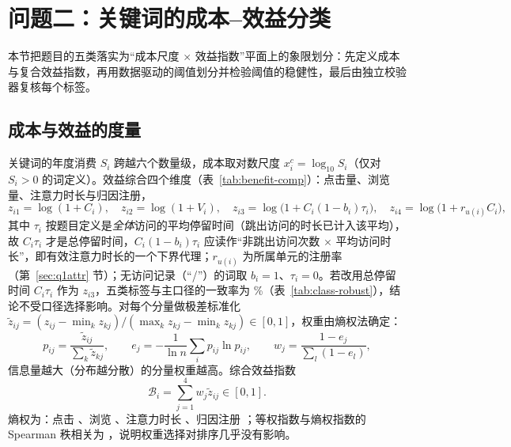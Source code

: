 \section{问题二：关键词的成本--效益分类}
\label{sec:q2}
本节把题目的五类落实为“成本尺度 $\times$ 效益指数”平面上的象限划分：先定义成本与复合效益指数，再用数据驱动的阈值划分并检验阈值的稳健性，最后由独立校验器复核每个标签。

\subsection{成本与效益的度量}
关键词的年度消费 $S_i$ 跨越六个数量级，成本取对数尺度 $x^{c}_i=\log_{10}S_i$（仅对 $S_i>0$ 的词定义）。效益综合四个维度（表~\ref{tab:benefit-comp}）：点击量、浏览量、注意力时长与归因注册，
\begin{equation}\label{eq:benefit-comp}
z_{i1}=\log(1+C_i),\quad z_{i2}=\log(1+V_i),\quad z_{i3}=\log\bigl(1+C_i(1-b_i)\tau_i\bigr),\quad z_{i4}=\log\bigl(1+r_{u(i)}C_i\bigr),
\end{equation}
其中 $\tau_i$ 按题目定义是\emph{全体}访问的平均停留时间（跳出访问的时长已计入该平均），故 $C_i\tau_i$ 才是总停留时间，$C_i(1-b_i)\tau_i$ 应读作“非跳出访问次数 $\times$ 平均访问时长”，即有效注意力时长的一个下界代理；$r_{u(i)}$ 为所属单元的注册率（第~\ref{sec:q1attr} 节）；无访问记录（“/”）的词取 $b_i=1$、$\tau_i=0$。若改用总停留时间 $C_i\tau_i$ 作为 $z_{i3}$，五类标签与主口径的一致率为 \valEngagementVariantAgreementPct\%（表~\ref{tab:class-robust}），结论不受口径选择影响。对每个分量做极差标准化 $\tilde z_{ij}=(z_{ij}-\min_k z_{kj})/(\max_k z_{kj}-\min_k z_{kj})\in[0,1]$，权重由熵权法\cite{shannon1948}确定：
\begin{equation}\label{eq:entropy}
p_{ij}=\frac{\tilde z_{ij}}{\sum_k\tilde z_{kj}},\qquad
e_j=-\frac{1}{\ln n}\sum_{i}p_{ij}\ln p_{ij},\qquad
w_j=\frac{1-e_j}{\sum_{l}(1-e_l)},
\end{equation}
信息量越大（分布越分散）的分量权重越高。综合效益指数
\begin{equation}\label{eq:index}
\mathcal B_i=\sum_{j=1}^{4}w_j\tilde z_{ij}\in[0,1].
\end{equation}
熵权为：点击 \valWeightClicks、浏览 \valWeightViews、注意力时长 \valWeightEngagement、归因注册 \valWeightReg；等权指数与熵权指数的 Spearman 秩相关为 \valEntropyEqualSpearman，说明权重选择对排序几乎没有影响。

